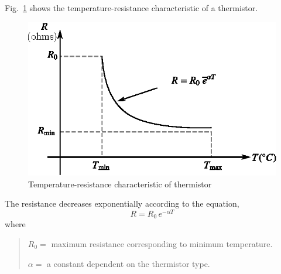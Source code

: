 Fig.~\ref{fig8.10} shows the temperature-resistance characteristic of a thermistor.
\begin{figure}[H]
\centering
\includegraphics[scale=.9]{chap8/fig8.10.eps}
\caption{Temperature-resistance characteristic of thermistor}\label{fig8.10}
\end{figure}

The resistance decreases exponentially according to the equation,
\begin{equation}
R=R_{0}\,e^{-\alpha T}\label{eq8.4}
\end{equation}
where
\begin{quote}
$R_{0}=$ maximum resistance corresponding to minimum temperature.

$\alpha=$ a constant dependent on the thermistor type.
\end{quote}


